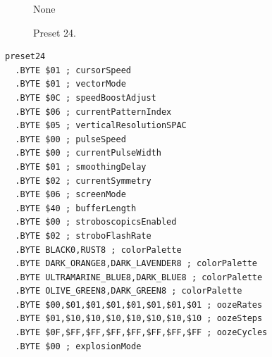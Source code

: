 \clearpage
\begin{minipage}[b]{0.48\linewidth}
\begin{figure}[H]                                                          
  \centering                                                             
  \begin{adjustbox}{width=5cm,center}                                   
None
  \end{adjustbox}                                                        
\caption*{Preset 24.}                                           
\end{figure}                                                               
\end{minipage}
\hspace{0.1cm}
\begin{minipage}[b]{0.48\linewidth}                            
\begin{lstlisting}[basicstyle=\ttfamily\tiny]
preset24
  .BYTE $01 ; cursorSpeed
  .BYTE $01 ; vectorMode
  .BYTE $0C ; speedBoostAdjust
  .BYTE $06 ; currentPatternIndex
  .BYTE $05 ; verticalResolutionSPAC
  .BYTE $00 ; pulseSpeed
  .BYTE $00 ; currentPulseWidth
  .BYTE $01 ; smoothingDelay
  .BYTE $02 ; currentSymmetry
  .BYTE $06 ; screenMode
  .BYTE $40 ; bufferLength
  .BYTE $00 ; stroboscopicsEnabled
  .BYTE $02 ; stroboFlashRate
  .BYTE BLACK0,RUST8 ; colorPalette
  .BYTE DARK_ORANGE8,DARK_LAVENDER8 ; colorPalette
  .BYTE ULTRAMARINE_BLUE8,DARK_BLUE8 ; colorPalette
  .BYTE OLIVE_GREEN8,DARK_GREEN8 ; colorPalette
  .BYTE $00,$01,$01,$01,$01,$01,$01,$01 ; oozeRates
  .BYTE $01,$10,$10,$10,$10,$10,$10,$10 ; oozeSteps
  .BYTE $0F,$FF,$FF,$FF,$FF,$FF,$FF,$FF ; oozeCycles
  .BYTE $00 ; explosionMode
\end{lstlisting}
\end{minipage}

\vspace*{-0.5cm}

